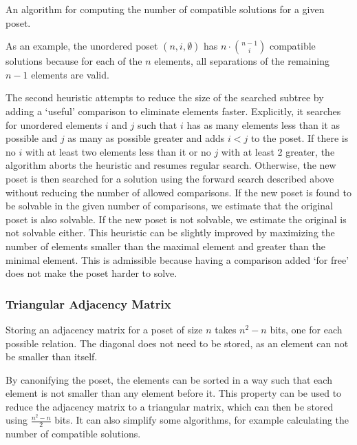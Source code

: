 \documentclass[10pt,journal,compsoc]{IEEEtran}
\begin{document}
\begin{algorithm}[t]
  \centering
  
  \caption{An algorithm for computing the number of compatible solutions for a given poset.}
  \label{algo:compatible_solutions}
\end{algorithm}

As an example, the unordered poset $(n,i,\emptyset)$ has $n \cdot \binom{n - 1}{i}$ compatible solutions because
for each of the $n$ elements, all separations of the remaining $n - 1$ elements
are valid.


The second heuristic attempts to reduce the size of the searched subtree by adding a `useful' comparison to eliminate elements faster.
Explicitly, it searches for unordered elements $i$ and $j$ such that $i$ has as many elements less than it as possible and $j$ as many as possible greater and adds $i < j$ to the poset.
If there is no $i$ with at least two elements less than it or no $j$ with at least 2 greater, the algorithm aborts the heuristic and resumes regular search.
Otherwise, the new poset is then searched for a solution using the forward search described above without reducing the number of allowed comparisons.
If the new poset is found to be solvable in the given number of comparisons, we estimate that the original poset is also solvable.
If the new poset is not solvable, we estimate the original is not solvable either.
This heuristic can be slightly improved by maximizing the number of elements smaller than the maximal element and greater than the minimal element.
This is admissible because having a comparison added `for free' does not make the poset harder to solve.

\subsubsection{Triangular Adjacency Matrix}
Storing an adjacency matrix for a poset of size $n$ takes $n^2 - n$ bits, one for each possible relation.
The diagonal does not need to be stored, as an element can not be smaller than itself.

By canonifying the poset, the elements can be sorted in a way such that each element is not smaller than any element before it.
This property can be used to reduce the adjacency matrix to a triangular matrix, which can then be stored using $\frac{n^2 - n}{2}$ bits.
It can also simplify some algorithms, for example calculating the number of compatible solutions.
\end{document}
